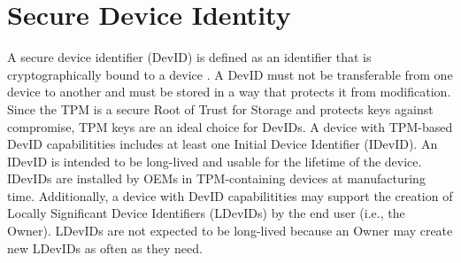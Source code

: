 \chapter{Secure Device Identity}



A secure device identifier (DevID) is defined as an identifier that is cryptographically bound to a device \cite{DevIDSpec-IEEE}. A DevID must not be transferable from one device to another and must be stored in a way that protects it from modification. Since the TPM is a secure Root of Trust for Storage and protects keys against compromise, TPM keys are an ideal choice for DevIDs. A device with TPM-based DevID capabilitities includes at least one Initial Device Identifier (IDevID).  An IDevID is intended to be long-lived and usable for the lifetime of the device. IDevIDs are installed by OEMs in TPM-containing devices at manufacturing time. Additionally, a device with DevID capabilitities may support the creation of Locally Significant Device Identifiers (LDevIDs) by the end user (i.e., the Owner). LDevIDs are not expected to be long-lived because an Owner may create new LDevIDs as often as they need.

